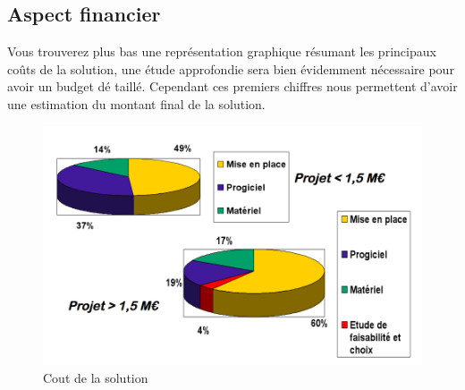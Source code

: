 \subsection{Aspect financier}
Vous trouverez plus bas une représentation graphique résumant les principaux coûts de la solution, une étude approfondie sera bien évidemment nécessaire pour avoir un budget dé	taillé. Cependant ces premiers chiffres nous permettent d'avoir une estimation du montant final de la solution.
\begin{figure}[H]
\begin{center}
 \includegraphics[scale=0.5]{CoutSolution.png}
  \caption{Cout de la solution}
\end{center}  
\end{figure}

